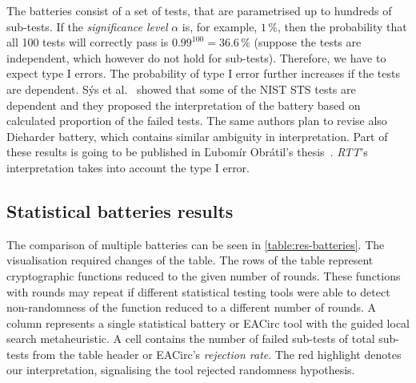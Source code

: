 \documentclass[
    digital,    %
    oneside,    %
    color,
    11pt,
    nocover,
    notable,
    nolof,
    nolot,
]{fithesis3}
\begin{document}
The batteries consist of a set of tests, that are parametrised up to hundreds of sub-tests. If the \textit{significance level} $\alpha$ is, for example, $1\,\%$, then the probability that all 100 tests will correctly pass is $0.99^{100}=36.6\,\%$ (suppose the tests are independent, which however do not hold for sub-tests). Therefore, we have to expect type I errors. The probability of type I error further increases if the tests are dependent. Sýs et al.~\cite{sys2015interpretation} showed that some of the NIST STS tests are dependent and they proposed the interpretation of the battery based on calculated proportion of the failed tests. The same authors plan to revise also Dieharder battery, which contains similar ambiguity in interpretation. Part of these results is going to be published in Ľubomír Obrátil's thesis~\cite{obratilMgrThesis}. \textit{RTT}'s interpretation takes into account the type I error.

\subsection{Statistical batteries results}
\label{subsec:relatwork-stat-res}

The comparison of multiple batteries can be seen in \cref{table:res-batteries}. The visualisation required changes of the table. The rows of the table represent cryptographic functions reduced to the given number of rounds. These functions with rounds may repeat if different statistical testing tools were able to detect non-randomness of the function reduced to a different number of rounds. A column represents a single statistical battery or EACirc tool with the guided local search metaheuristic. A cell contains the number of failed sub-tests of total sub-tests from the table header or EACirc's \textit{rejection rate}. The red highlight denotes our interpretation, signalising the tool rejected randomness hypothesis.
\end{document}
